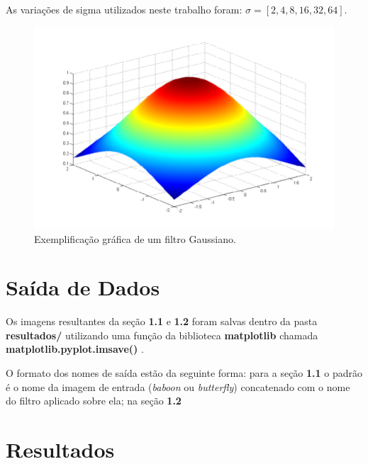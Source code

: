 \documentclass[twoside,twocolumn]{article}
\begin{document}
As variações de sigma utilizados neste trabalho foram: $\sigma = \left[2,4,8,16,32,64\right]$.

\begin{figure}[H]
\begin{center}
	\includegraphics[scale=.2]{figures/filtro_gaussiano.png}
\caption{Exemplificação gráfica de um filtro Gaussiano.} \label{gdimotes}
\end{center}
\end{figure}


\section{Saída de Dados}

Os imagens resultantes da seção \textbf{1.1} e \textbf{1.2} foram salvas dentro da pasta \textbf{resultados/} utilizando uma função da biblioteca \textbf{matplotlib} chamada \textbf{matplotlib.pyplot.imsave()} \cite{b3}.

O formato dos nomes de saída estão da seguinte forma: para a seção \textbf{1.1} o padrão é o nome da imagem de entrada (\textit{baboon} ou \textit{butterfly}) concatenado com o nome do filtro aplicado sobre ela; na seção \textbf{1.2} 


\section{Resultados}

\end{document}
